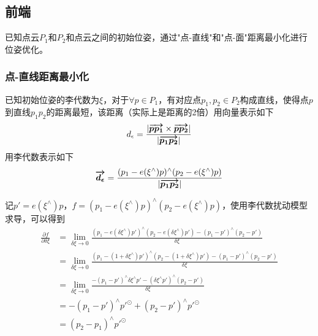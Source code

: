 \documentclass{ctexart}
\begin{document}
{	\subsection{前端}
	已知点云$P_1$和$P_2$和点云之间的初始位姿，通过"点-直线"和"点-面"距离最小化进行位姿优化。
	\subsubsection{点-直线距离最小化}
	已知初始位姿的李代数为$\xi$，对于$\forall p \in P_1$，有对应点$p_1,p_2 \in P_2$构成直线，使得点$p$到直线$p_1p_2$的距离最短，该距离（实际上是距离的2倍）用向量表示如下
	\begin{equation}
	d_{\epsilon} =
	\frac{|\boldmath\overrightarrow{p p_1}\unboldmath \times \boldmath\overrightarrow{p p_2}\unboldmath|}{|\boldmath\overrightarrow{p_1 p_2}\unboldmath|}
	\end{equation}
	用李代数表示如下
	\begin{equation}
	\boldmath\overrightarrow{d_{\epsilon}}\unboldmath =
	\frac{(p_1-e(\xi ^\wedge)p) 
		^\wedge 
		(p_2-e(\xi ^\wedge)p)}{|\boldmath\overrightarrow{p_1 p_2}\unboldmath|}
	\end{equation}
	\par 记$p'=e(\xi ^\wedge)p$，$f=(p_1-e(\xi ^\wedge)p) ^\wedge (p_2-e(\xi ^\wedge)p)$，使用李代数扰动模型求导，可以得到
	\begin{equation}
	\begin{split}
	\frac{\partial f}{\partial \delta \xi}
	&=
	\lim\limits_{\delta \xi \rightarrow 0}
	\frac{(p_1-e(\delta \xi ^\wedge) p') 
	^\wedge 
	(p_2-e(\delta \xi ^\wedge) p')
	-
	(p_1-p') ^\wedge (p_2-p')
	}{\delta \xi} \\
	&=
	\lim\limits_{\delta \xi \rightarrow 0}
	\frac{(p_1-(1+\delta \xi ^\wedge) p') 
		^\wedge 
		(p_2-(1+\delta \xi ^\wedge) p')
		-
		(p_1-p') ^\wedge (p_2-p')
	}{\delta \xi} \\
	&=
	\lim\limits_{\delta \xi \rightarrow 0}
	\frac{-(p_1-p')^\wedge\delta\xi^\wedge p'- (\delta\xi^\wedge p')^\wedge(p_2-p')}{\delta \xi} \\
	&=
	- (p_1-p')^\wedge p'^\odot + (p_2-p')^\wedge p'^\odot \\
	&=
	(p_2 - p_1)^\wedge p'^\odot
	\end{split}
	\end{equation}
	
}
\end{document}
